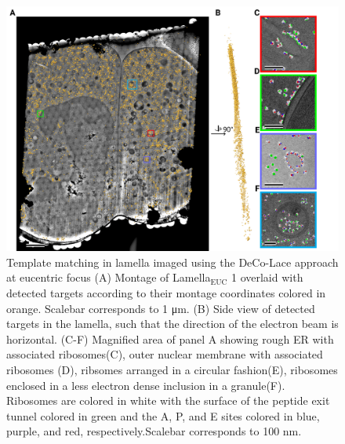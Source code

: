 \documentclass[
]{article}
\begin{document}
\begin{figure}
\hypertarget{fig:matching_euc}{%
\centering
\includegraphics{figures/matching_euc.png}
\caption{Template matching in lamella imaged using the DeCo-Lace approach at eucentric
focus (A) Montage of Lamella\(_\textrm{EUC}\) 1 overlaid with detected targets according to
their montage coordinates colored in orange. Scalebar corresponds to 1 μm. (B) Side view of detected targets in the lamella, such that the
direction of the electron beam is horizontal. (C-F) Magnified area of panel A
showing rough ER with associated ribosomes(C), outer nuclear membrane with
associated ribosomes (D), ribsomes arranged in a circular fashion(E), ribosomes
enclosed in a less electron dense inclusion in a granule(F). Ribosomes are colored in white with the surface of the peptide exit tunnel colored in green and the A, P, and E sites colored in blue, purple, and red, respectively.Scalebar corresponds to 100 nm.}\label{fig:matching_euc}
}
\end{figure}
\end{document}
